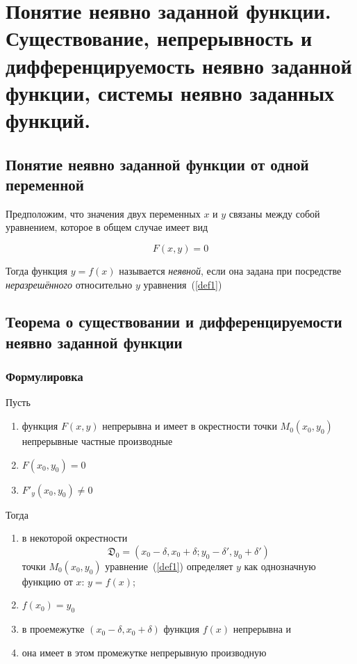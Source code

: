 \section{Понятие неявно заданной функции.
Существование, непрерывность и дифференцируемость неявно заданной функции,
системы неявно заданных функций.}

\subsection{Понятие неявно заданной функции от одной переменной}Предположим, что значения двух переменных $x$ и $y$ связаны между собой уравнением, которое в общем случае имеет вид

\begin{equation}\label{def1}
    F(x, y) = 0
\end{equation}

Тогда функция $y = f(x)$ называется \emph{неявной}, если она задана при посредстве \emph{неразрешённого} относительно $y$ уравнения~(\ref{def1})

\subsection{Теорема о существовании и дифференцируемости неявно заданной функции}

\subsubsection*{Формулировка}

Пусть 
\begin{enumerate}
    \item функция $F(x, y)$ непрерывна и имеет в окрестности точки $M_0(x_0, y_0)$
    непрерывные частные производные
    \item $F(x_0, y_0) = 0$
    \item $F'_y(x_0, y_0) \neq 0$
\end{enumerate}
Тогда
\begin{enumerate}
    \item в некоторой окрестности 
    \begin{equation*}
        \mathfrak{D}_0 = (x_0 - \delta, x_0 + \delta; y_0 - \delta', y_0 + \delta')
    \end{equation*}
    точки $M_0 (x_0, y_0)$ уравнение~(\ref{def1}) определяет $y$ как однозначную
    функцию от $x$: $y = f(x)$;
    \item $f(x_0) = y_0$
    \item в проемежутке $(x_0 - \delta, x_0 + \delta)$ функция $f(x)$ непрерывна и
    \item она имеет в этом промежутке непрерывную производную
\end{enumerate}

